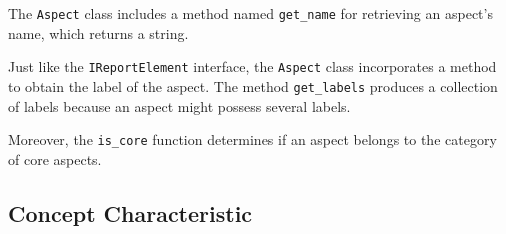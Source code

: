 The \texttt{Aspect} class includes a method named \texttt{get\_name} for retrieving an aspect's name,
which returns a string.


Just like the \texttt{IReportElement} interface, the \texttt{Aspect} class incorporates a method to obtain the label of the aspect.
The method \texttt{get\_labels} produces a collection of labels because an aspect might possess several labels.

Moreover, the \texttt{is\_core} function determines if an aspect belongs to the category of core aspects.



\subsection{Concept Characteristic}

